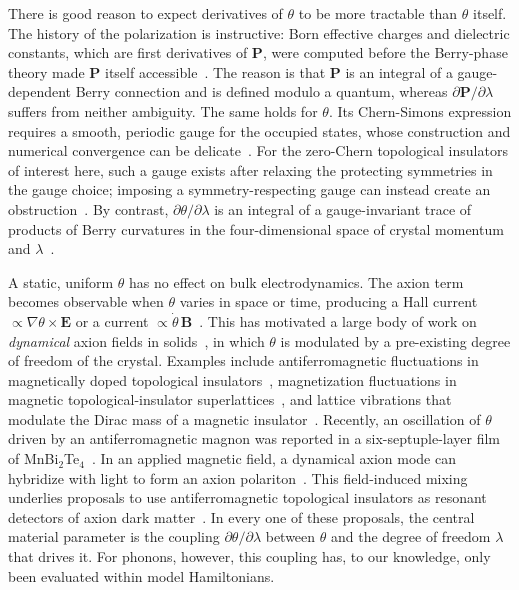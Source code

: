 \documentclass[galley,aps,pra,10pt,amsmath,amssymb,
    superscriptaddress,nofootinbib,longbibliography]{revtex4-2}
\newcounter{comm}
\def\commnext{\stepcounter{comm}}
\def\commtext{{\bf\color{blue}[\arabic{comm}]}}
\def\commmar{{\bf\color{blue}[\arabic{comm}]}}
\def\dsm#1{\commnext\marginpar{\small DS\commmar: #1}\commtext}
\def\dsm#1{}
\newcommand{\MBT}{MnBi$_2$Te$_4$}
\begin{document}
There is good reason to expect derivatives of $\theta$ to be more tractable than $\theta$ itself.
The history of the polarization is instructive: Born effective charges and dielectric constants, which are first derivatives of $\mathbf P$, were computed before the Berry-phase theory made $\mathbf P$ itself accessible~\cite{kunc1982abinitio, resta1994macroscopic,Resta1992polarization, baroni2001phonons, gonze1997dynamical}. The reason is that $\mathbf P$ is an integral of a gauge-dependent Berry connection and is defined modulo a quantum, whereas $\partial\mathbf P/\partial\lambda$\dsm{Sudden introduction of $\lambda$ without an explanation of what is.} suffers from neither ambiguity. The same holds for $\theta$. Its Chern-Simons expression requires a smooth, periodic gauge for the occupied states, whose construction and numerical convergence can be delicate~\cite{coh2011chern, liu2015gauge, varnava2020axion, cole2026exact}. For the zero-Chern topological insulators of interest here, such a gauge exists after relaxing the protecting symmetries in the gauge choice; imposing a symmetry-respecting gauge can instead create an obstruction~\cite{soluyanov2011wannier, cole2025reduced}. By contrast, $\partial\theta/\partial\lambda$ is an integral of a gauge-invariant trace of products of Berry curvatures in the four-dimensional space of crystal momentum and $\lambda$~\cite{qi2008topological, essin2010orbital, taherinejad2015adiabatic, olsen2017surface}.

A static, uniform $\theta$ has no effect on bulk electrodynamics. The axion term becomes observable when $\theta$ varies in space or time, producing a Hall current $\propto\nabla\theta\times\mathbf E$ or a current $\propto\dot\theta\,\mathbf B$~\cite{wilczek1987two}. This has motivated a large body of work on \emph{dynamical} axion fields in solids~\cite{nenno2020axion, sekine2021axion}, in which $\theta$ is modulated by a pre-existing degree of freedom of the crystal. Examples include antiferromagnetic fluctuations in magnetically doped topological insulators~\cite{li2010dynamical}, magnetization fluctuations in magnetic topological-insulator superlattices~\cite{wang2016dynamical}, and lattice vibrations that modulate the Dirac mass of a magnetic insulator~\cite{lhachemi2024phononic}. Recently, an oscillation of $\theta$ driven by an antiferromagnetic magnon was reported in a six-septuple-layer film of \MBT{}~\cite{qiu2025observation}. In an applied magnetic field, a dynamical axion mode can hybridize with light to form an axion polariton~\cite{li2010dynamical}. This field-induced mixing underlies proposals to use antiferromagnetic topological insulators as resonant detectors of axion dark matter~\cite{marsh2019proposal, schutteengel2021axion}. In every one of these proposals, the central material parameter is the coupling $\partial\theta/\partial\lambda$ between $\theta$ and the degree of freedom $\lambda$ that drives it. For phonons, however, this coupling has, to our knowledge, only been evaluated within model Hamiltonians.
\end{document}
